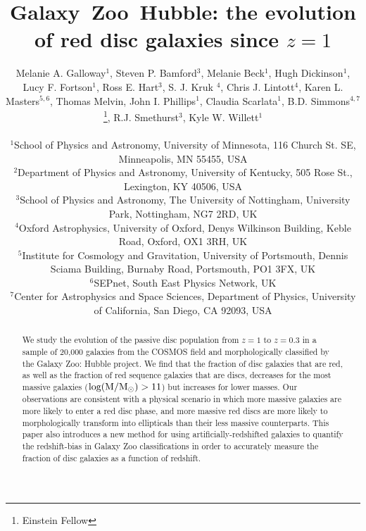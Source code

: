 \documentclass[useAMS,usenatbib]{mn2e}
\begin{document}
\title[Galaxy~Zoo~Hubble: passive red discs]{Galaxy~Zoo~Hubble: the evolution of red disc galaxies since $z=1$}
\author[Galloway et~al.]{\parbox[t]{16cm}{Melanie A. Galloway$^{1}$, Steven P. Bamford$^{3}$, Melanie Beck$^{1}$,
Hugh Dickinson$^{1}$, Lucy F. Fortson$^{1}$, Ross E. Hart$^{3}$, S. J. Kruk $^{4}$, Chris J. Lintott$^{4}$,
 Karen L. Masters$^{5,6}$, Thomas Melvin, John I. Phillips$^{1}$, Claudia Scarlata$^{1}$,
 B.D. Simmons$^{4,7}$\footnote{Einstein Fellow}, R.J. Smethurst$^{3}$,
Kyle W. Willett$^{1}$
\vspace{0.1in} }\\
$^{1}$School of Physics and Astronomy, University of Minnesota, 116 Church St. SE, Minneapolis, MN 55455, USA \\
$^{2}$Department of Physics and Astronomy, University of Kentucky, 505 Rose St., Lexington, KY 40506, USA \\
$^{3}$School of Physics and Astronomy, The University of Nottingham, University Park, Nottingham, NG7 2RD, UK \\
$^{4}$Oxford Astrophysics, University of Oxford, Denys Wilkinson Building, Keble Road, Oxford, OX1 3RH, UK \\
$^{5}$Institute for Cosmology and Gravitation, University of Portsmouth, Dennis Sciama Building, Burnaby Road, Portsmouth, PO1 3FX, UK \\
$^{6}$SEPnet, South East Physics Network, UK \\
$^{7}$Center for Astrophysics and Space Sciences, Department of Physics, University of California, San Diego, CA 92093, USA \\
   }
\maketitle

\begin{abstract}
We study the evolution of the passive disc population from $z=1$ to $z=0.3$ in a sample of 20,000 galaxies from the COSMOS field and morphologically classified by the Galaxy Zoo: Hubble project. We find that the fraction of disc galaxies that are red, as well as the fraction of red sequence galaxies that are discs, decreases for the most massive galaxies ($\rm log(M/M_{\odot})>11$) but increases for lower masses. Our observations are consistent with a physical scenario in which more massive galaxies are more likely to enter a red disc phase, and more massive red discs are more likely to morphologically transform into ellipticals than their less massive counterparts. This paper also introduces a new method for using artificially-redshifted galaxies to quantify the redshift-bias in Galaxy Zoo classifications in order to accurately measure the fraction of disc galaxies as a function of redshift.  


\end{abstract}
\end{document}
